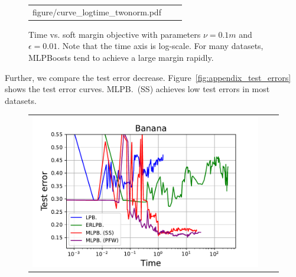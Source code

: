 \begin{figure}[p]
\begin{tabular}{ccc}
\begin{minipage}[t]{0.31\hsize}
            {figure/curve_logtime_twonorm.pdf}
        \end{minipage}
    \end{tabular}
    \caption{%
        Time vs. soft margin objective %
        with parameters $\nu = 0.1m$ and $\epsilon = 0.01$. %
        Note that the time axis is log-scale. %
        For many datasets, MLPBoosts tend to achieve %
        a large margin rapidly. %
    }
    \label{fig:appendix_margin_objectives}
\end{figure}

Further, we compare the test error decrease. 
Figure~\ref{fig:appendix_test_errors} shows the test error curves. 
MLPB.~(SS) achieves low test errors in most datasets. 
\begin{figure}[p]
    \centering
    \begin{tabular}{ccc}
        \begin{minipage}[t]{0.31\hsize}
            \centering
            \includegraphics[keepaspectratio, scale=0.30]
            {figure/test_logtime_banana.pdf}
        \end{minipage}
        &
        \begin{minipage}[t]{0.31\hsize}
            \centering
            \includegraphics[keepaspectratio, scale=0.30]

\end{minipage}
\end{tabular}
\end{figure}
